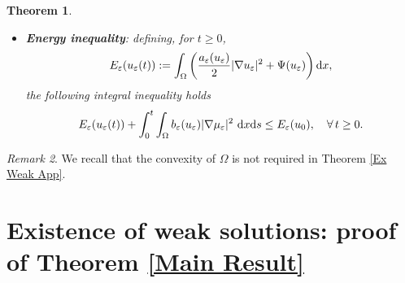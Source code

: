 \documentclass[11pt,  reqno]{amsart}%
\theoremstyle{plain}
\newtheorem{theorem}{Theorem}[section]
\theoremstyle{definition}
\theoremstyle{remark}
\newtheorem{remark}[theorem]{Remark}
\numberwithin{equation}{section}
\newcommand{\ve}{\varepsilon}
\newcommand{\dx}{\textup{d}x}
\newcommand{\ds}{\textup{d}s}
\begin{document}
\begin{theorem}
\begin{itemize}
            \vspace{0.05cm}
			\item[(iii)] \textbf{Energy inequality}: defining, for $ t \ge 0 $,
            $$
            E_{\ve}(u_\ve(t)):= \int_{\Omega} \left(\dfrac{a_{\ve}(u_{\ve})}{2}|\nabla u_{\ve}|^2+ \Psi(u_\ve)\right) \dx,
            $$
			the following integral inequality holds
			\begin{equation} \label{energy inequality}
				E_{\ve}(u_\ve(t)) +  \int_0^t \int_{\Omega} b_{\ve}(u_{\ve})|\nabla \mu_{\ve}|^2 \ \dx \ds \le E_{\ve}(u_0), \quad \forall \, t \geq 0.
			\end{equation} 
		\end{itemize} 
	\end{theorem}

\begin{remark}
We recall that the convexity of $\Omega$ is not required in Theorem \ref{Ex Weak App}.
\end{remark}

	\section{Existence of weak solutions: proof of Theorem \ref{Main Result}} 
	\label{s-proof-main}
	
\end{document}
